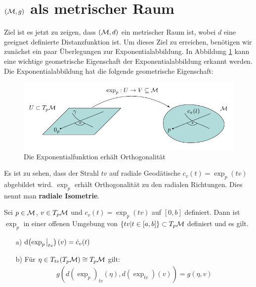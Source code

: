 \section{$(\mathcal{M}, g)$ als metrischer Raum} 
Ziel ist es jetzt zu zeigen, dass $(\mathcal{M}, d)$ ein metrischer Raum ist, wobei $d$ eine geeignet definierte Distanzfunktion ist.
Um dieses Ziel zu erreichen, benötigen wir zunächst ein paar Überlegungen zur Exponentialabbildung.
In Abbildung \ref{img:exponentialfunction} kann eine wichtige geometrische Eigenschaft der Exponentialabbildung erkannt werden.
Die Exponentialabbildung hat die folgende geometrische Eigenschaft:
\begin{figure}[H]
\centering
\includegraphics[width=1\linewidth]{figures/tikz/exponentialfunction.pdf}
\caption{Die Exponentialfunktion erhält Orthogonalität}
\label{img:exponentialfunction}
\end{figure} 
Es ist zu sehen, dass der Strahl $t v$ auf radiale Geodätische $c_v(t) = \exp_p (t v)$ abgebildet wird.
$\exp_p$ erhält Orthogonalität zu den radialen Richtungen.
Dies nennt man \textbf{radiale Isometrie}.
\begin{lem}[Gaußlemma]
    \label{lem:gaußlemma}
    Sei $p \in \mathcal{M}$, $v \in T_p \mathcal{M} $ und $c_v(t) = \exp_p(tv)$ auf $[0, b]$ definiert.
    Dann ist $\exp_p$ in einer offenen Umgebung von $\{ tv \vert t\in [a, b] \} \subset T_p \mathcal{M}$ definiert und es gilt.
    \begin{itemize}
     \item[a)] $\dd ( \exp_p \eval_{t v})(v) = \dot{c}_v(t)$
    \item [b)] Für $\eta \in T_{tv} ( T_p \mathcal{M} ) \cong T_p \mathcal{M}$ gilt:
    \begin{align*}
        g(d(\exp_p)_{tv} (\eta), d(\exp_{tv})(v)) = g(\eta, v)
    \end{align*}
    \end{itemize}
\end{lem}
